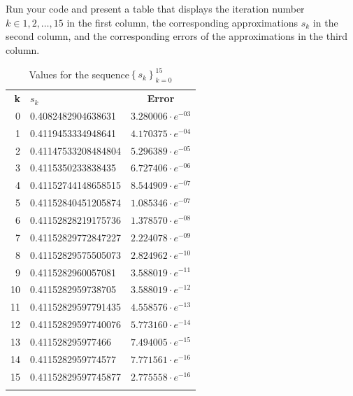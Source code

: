 \documentclass{article}
\begin{document}
\section{}
Run your code and present a table that displays the iteration number $k \in {1,2,\dots,15}$ in the first column, the corresponding approximations $s_k$ in the second column, and the corresponding errors of the approximations in the third column.
\vspace{10mm}

\begin{table}[H]
    \centering
    \begin{tabular}{|r|l|c|}
        \Xhline{1 pt}
         \centering \textbf{k}& \textbf{$s_k$}& \textbf{Error}  \\
         \Xhline{1.5 pt}
         0 & 0.4082482904638631&$3.280006\cdot e^{-03}$\\
         \Xhline{1 pt}
         1 & 0.4119453334948641&$4.170375\cdot e^{-04}$\\
         \Xhline{1 pt}
         2 & 0.41147533208484804&$5.296389\cdot e^{-05}$\\
         \Xhline{1 pt}
         3 & 0.4115350233838435&$6.727406\cdot e^{-06}$\\
         \Xhline{1 pt}
         4 & 0.41152744148658515 &$8.544909\cdot e^{-07}$\\
         \Xhline{1 pt}
         5 & 0.41152840451205874 & $1.085346\cdot e^{-07}$\\
          \Xhline{1 pt}
         6 & 0.41152828219175736 & $1.378570\cdot e^{-08}$\\
          \Xhline{1 pt}
         7 & 0.41152829772847227 &$2.224078\cdot e^{-09}$\\
          \Xhline{1 pt}
         8 & 0.41152829575505073 &$2.824962\cdot e^{-10}$\\
          \Xhline{1 pt}
         9 & 0.4115282960057081 &$3.588019\cdot e^{-11}$\\
          \Xhline{1 pt}
         10 & 0.4115282959738705 &$3.588019\cdot e^{-12}$\\
          \Xhline{1 pt}
         11 & 0.41152829597791435 &$4.558576\cdot e^{-13}$\\
          \Xhline{1 pt}
         12 & 0.41152829597740076 &$5.773160\cdot e^{-14}$\\
          \Xhline{1 pt}
         13 & 0.411528295977466 &$7.494005\cdot e^{-15}$\\
          \Xhline{1 pt}
         14 & 0.4115282959774577&$7.771561\cdot e^{-16}$\\
          \Xhline{1 pt}
         15 & 0.41152829597745877&$2.775558\cdot e^{-16}$\\
         \Xhline{1 pt}
    \end{tabular}
    \caption{Values for the sequence$\left\{ s_k\right\}_{k=0}^{15}$}
    \label{tab:15sequence}
\end{table}
\end{document}
